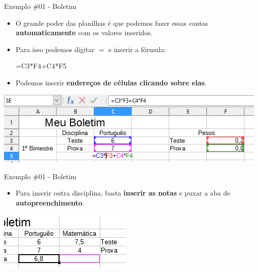 \begin{frame}{Exemplo \#01 - Boletim}
	\begin{block}{}
		\begin{itemize}
			\item O grande poder das planilhas é que podemos fazer essas contas \textbf{automaticamente} com os valores inseridos.
			\item Para isso podemos digitar $ = $ e inserir a fórmula:
			
			\centerline{=C3*F4+C4*F5}
			\item Podemos inserir \textbf{endereços de células clicando sobre elas}.
		\end{itemize}
	\end{block}
	
	\bigskip
	
	\centering
	\includegraphics[width=1\linewidth]{Figuras/Ch06/fig44.2}
\end{frame}


\begin{frame}{Exemplo \#01 - Boletim}
	\begin{block}{}
		\begin{itemize}
			\item Para inserir outra disciplina, basta \textbf{inserir as notas} e puxar a aba de \textbf{autopreenchimento}.
		\end{itemize}
	\end{block}
	
	\centering
	\includegraphics[width=0.8\linewidth]{Figuras/Ch06/fig44.3}
\end{frame}


